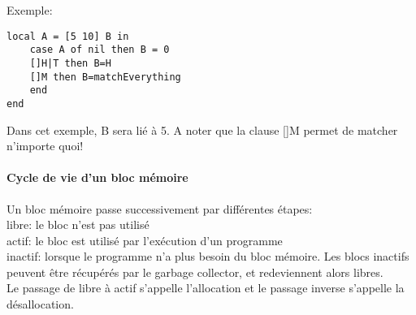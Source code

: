 Exemple:

\begin{lstlisting}
local A = [5 10] B in
	case A of nil then B = 0
	[]H|T then B=H
	[]M then B=matchEverything
	end
end
\end{lstlisting}

Dans cet exemple, B sera lié à 5. A noter que la clause []M permet de matcher n'importe quoi!

\paragraph{Cycle de vie d'un bloc mémoire}

Un bloc mémoire passe successivement par différentes étapes:\\
libre: le bloc n'est pas utilisé\\
actif: le bloc est utilisé par l'exécution d'un programme\\
inactif: lorsque le programme n'a plus besoin du bloc mémoire. Les blocs inactifs peuvent être récupérés par le garbage collector, et redeviennent alors libres.\\
Le passage de libre à actif s'appelle l'allocation et le passage inverse s'appelle la désallocation.








